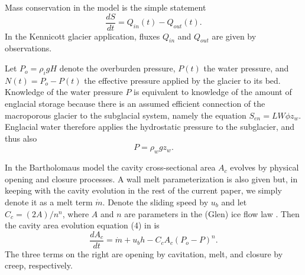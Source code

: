 \documentclass[twocolumn,letterpaper]{igs}
\begin{document}
Mass conservation in the model is the simple statement \citep{Bartholomausetal2008}
\begin{equation}
\frac{dS}{dt} = Q_{in}(t) - Q_{out}(t). \label{eq:barth:massconserve}
\end{equation}
In the Kennicott glacier application, fluxes $Q_{in}$ and $Q_{out}$ are given by observations.

Let $P_o=\rho_i g H$ denote the overburden pressure, $P(t)$ the water pressure, and $N(t)=P_o-P(t)$ the effective pressure applied by the glacier to its bed.  Knowledge of the water pressure $P$ is equivalent to knowledge of the amount of englacial storage because there is an assumed efficient connection of the macroporous glacier to the subglacial system, namely the equation $S_{en}=L W \phi z_w$.  Englacial water therefore applies the hydrostatic pressure to the subglacier, and thus also
\begin{equation}
P = \rho_w g z_w.  \label{eq:barth:englacialpressure}
\end{equation}

In the Bartholomaus model the cavity cross-sectional area $A_c$ evolves by physical opening and closure processes.  A wall melt parameterization is also given but, in keeping with the cavity evolution in the rest of the current paper, we simply denote it as a melt term $\dot m$.  Denote the sliding speed by $u_b$ and let $C_c = (2 A)/n^n$, where $A$ and $n$ are parameters in the (Glen) ice flow law \citep{CuffeyPaterson}.  Then the cavity area evolution equation (4) in \cite{Bartholomausetal2011} is
\begin{equation}
\frac{dA_c}{dt} = \dot m + u_b h - C_c A_c (P_o-P)^n.  \label{eq:barth:cavityevolution}
\end{equation}
The three terms on the right are opening by cavitation, melt, and closure by creep, respectively.
\end{document}
